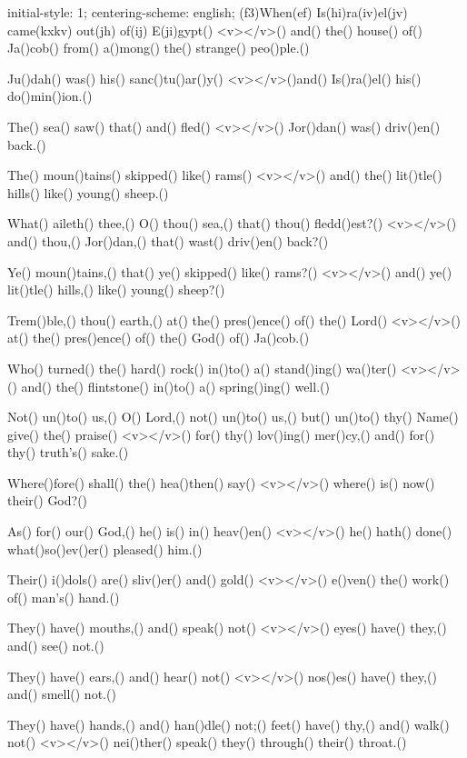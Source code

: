 initial-style: 1;
centering-scheme: english;
(f3)When(ef) Is(hi)ra(iv)el(jv) came(kxkv) out(jh) of(ij) E(ji)gypt() <v>\greheightstar</v>() and() the() house() of() Ja()cob() from() a()mong() the() strange() peo()ple.()

Ju()dah() was() his() sanc()tu()ar()y() <v>\greheightstar</v>()and() Is()ra()el() his() do()min()ion.()

The() sea() saw() that() and() fled() <v>\greheightstar</v>() Jor()dan() was() driv()en() back.()

The() moun()tains() skipped() like() rams() <v>\greheightstar</v>() and() the() lit()tle() hills() like() young() sheep.()

What() aileth() thee,() O() thou() sea,() that() thou() fledd()est?() <v>\greheightstar</v>() and() thou,() Jor()dan,() that() wast() driv()en() back?()

Ye() moun()tains,() that() ye() skipped() like() rams?() <v>\greheightstar</v>() and() ye() lit()tle() hills,() like() young() sheep?()

Trem()ble,() thou() earth,() at() the() pres()ence() of() the() Lord() <v>\greheightstar</v>() at() the() pres()ence() of() the() God() of() Ja()cob.()

Who() turned() the() hard() rock() in()to() a() stand()ing() wa()ter() <v>\greheightstar</v>() and() the() flintstone() in()to() a() spring()ing() well.()

Not() un()to() us,() O() Lord,() not() un()to() us,() but() un()to() thy() Name() give() the() praise() <v>\greheightstar</v>() for() thy() lov()ing() mer()cy,() and() for() thy() truth's() sake.()

Where()fore() shall() the() hea()then() say() <v>\greheightstar</v>() where() is() now() their() God?()

As() for() our() God,() he() is() in() heav()en() <v>\greheightstar</v>() he() hath() done() what()so()ev()er() pleased() him.()

Their() i()dols() are() sliv()er() and() gold() <v>\greheightstar</v>() e()ven() the() work() of() man's() hand.()

They() have() mouths,() and() speak() not() <v>\greheightstar</v>() eyes() have() they,() and() see() not.()

They() have() ears,() and() hear() not() <v>\greheightstar</v>() nos()es() have() they,() and() smell() not.()

They() have() hands,() and() han()dle() not;() feet() have() thy,() and() walk() not() <v>\greheightstar</v>() nei()ther() speak() they() through() their() throat.()

